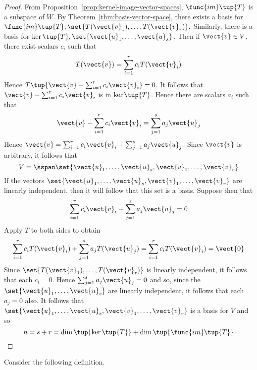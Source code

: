 \begin{proof}
From Proposition~\ref{prop:kernel-image-vector-spaces}, $\func{im}\tup{T} $
is a subspace of $W$. By Theorem~\ref{thm:basis-vector-space}, there exists a basis for $
\func{im}\tup{T} ,\set{T(\vect{v}_{1}),\ldots,T(\vect{v}_{r})}
. $ Similarly, there is a basis for $\ker \tup{T} ,\set{\vect{u}
_{1},\ldots,\vect{u}_{s}}$. Then if $\vect{v}\in V$, there exist
scalars $c_{i}$ such that 
\begin{equation*}
T(\vect{v})=\sum_{i=1}^{r}c_{i}T(\vect{v}_{i})
\end{equation*}
Hence $T\tup{\vect{v}-\sum_{i=1}^{r}c_{i}\vect{v}_{i}} =0$. It follows
that $\vect{v}-\sum_{i=1}^{r}c_{i}\vect{v}_{i}$ is in $\ker \tup{T}$.
Hence there are scalars $a_{i}$ such that 
\begin{equation*}
\vect{v}-\sum_{i=1}^{r}c_{i}\vect{v}_{i}=\sum_{j=1}^{s}a_{j}\vect{u}_{j}
\end{equation*}
Hence $\vect{v}=\sum_{i=1}^{r}c_{i}\vect{v}_{i}+\sum_{j=1}^{s}a_{j}\vect{u}
_{j}. $ Since $\vect{v}$ is arbitrary, it follows that 
\begin{equation*}
V=\sspan\set{\vect{u}_{1},\ldots,\vect{u}_{s},\vect{v}_{1},\ldots,
\vect{v}_{r}}
\end{equation*}
If the vectors $\set{\vect{u}_{1},\ldots,\vect{u}_{s},\vect{v}_{1},\ldots,
\vect{v}_{r}} $ are linearly independent, then it will follow that
this set is a basis. Suppose then that 
\begin{equation*}
\sum_{i=1}^{r}c_{i}\vect{v}_{i}+\sum_{j=1}^{s}a_{j}\vect{u}_{j}=0
\end{equation*}
Apply $T$ to both sides to obtain 
\begin{equation*}
\sum_{i=1}^{r}c_{i}T(\vect{v}_{i})+\sum_{j=1}^{s}a_{j}T(\vect{u}
_{j})=\sum_{i=1}^{r}c_{i}T(\vect{v}_{i})= \vect{0}
\end{equation*}
Since $\set{T(\vect{v}_{1}),\ldots,T(\vect{v}_{r})} $ is linearly
independent, it follows that each $c_{i}=0$. Hence $\sum_{j=1}^{s}a_{j}\vect{u
}_{j}=0$ and so, since the $\set{\vect{u}_{1},\ldots,\vect{u}_{s}} $
are linearly independent, it follows that each $a_{j}=0$ also. It follows
that $\set{\vect{u}_{1},\ldots,\vect{u}_{s},\vect{v}_{1},\ldots,\vect{v}
_{r}} $ is a basis for $V$ and so 
\begin{equation*}
n=s+r=\dim \tup{\ker \tup{T} } +\dim \tup{\func{im}\tup{
T} }
\end{equation*}
\end{proof}

Consider the following definition. 

